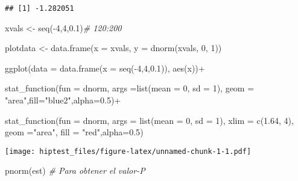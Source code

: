 \documentclass[
]{article}
\newenvironment{Shaded}{}{}
\newcommand{\AttributeTok}[1]{\textcolor[rgb]{0.49,0.56,0.16}{#1}}
\newcommand{\CommentTok}[1]{\textcolor[rgb]{0.38,0.63,0.69}{\textit{#1}}}
\newcommand{\DecValTok}[1]{\textcolor[rgb]{0.25,0.63,0.44}{#1}}
\newcommand{\FloatTok}[1]{\textcolor[rgb]{0.25,0.63,0.44}{#1}}
\newcommand{\FunctionTok}[1]{\textcolor[rgb]{0.02,0.16,0.49}{#1}}
\newcommand{\NormalTok}[1]{#1}
\newcommand{\OtherTok}[1]{\textcolor[rgb]{0.00,0.44,0.13}{#1}}
\newcommand{\SpecialCharTok}[1]{\textcolor[rgb]{0.25,0.44,0.63}{#1}}
\newcommand{\StringTok}[1]{\textcolor[rgb]{0.25,0.44,0.63}{#1}}
\begin{document}
\begin{verbatim}
## [1] -1.282051
\end{verbatim}

\begin{Shaded}
\begin{Highlighting}[]
\NormalTok{xvals }\OtherTok{\textless{}{-}} \FunctionTok{seq}\NormalTok{(}\SpecialCharTok{{-}}\DecValTok{4}\NormalTok{,}\DecValTok{4}\NormalTok{,}\FloatTok{0.1}\NormalTok{)}\CommentTok{\# 120:200}

\NormalTok{plotdata }\OtherTok{\textless{}{-}} \FunctionTok{data.frame}\NormalTok{(}\AttributeTok{x =}\NormalTok{ xvals, }\AttributeTok{y =} \FunctionTok{dnorm}\NormalTok{(xvals, }\DecValTok{0}\NormalTok{, }\DecValTok{1}\NormalTok{))}

\FunctionTok{ggplot}\NormalTok{(}\AttributeTok{data =} \FunctionTok{data.frame}\NormalTok{(}\AttributeTok{x =} \FunctionTok{seq}\NormalTok{(}\SpecialCharTok{{-}}\DecValTok{4}\NormalTok{,}\DecValTok{4}\NormalTok{,}\FloatTok{0.1}\NormalTok{)), }\FunctionTok{aes}\NormalTok{(x))}\SpecialCharTok{+}
 
  \FunctionTok{stat\_function}\NormalTok{(}\AttributeTok{fun =}\NormalTok{ dnorm, }\AttributeTok{args =}\FunctionTok{list}\NormalTok{(}\AttributeTok{mean =} \DecValTok{0}\NormalTok{, }\AttributeTok{sd =} \DecValTok{1}\NormalTok{),}
                \AttributeTok{geom =} \StringTok{"area"}\NormalTok{,}\AttributeTok{fill=}\StringTok{"blue2"}\NormalTok{,}\AttributeTok{alpha=}\FloatTok{0.5}\NormalTok{)}\SpecialCharTok{+}

  \FunctionTok{stat\_function}\NormalTok{(}\AttributeTok{fun =}\NormalTok{ dnorm, }\AttributeTok{args =} \FunctionTok{list}\NormalTok{(}\AttributeTok{mean =} \DecValTok{0}\NormalTok{, }\AttributeTok{sd =} \DecValTok{1}\NormalTok{), }\AttributeTok{xlim =} \FunctionTok{c}\NormalTok{(}\FloatTok{1.64}\NormalTok{, }\DecValTok{4}\NormalTok{),}
                \AttributeTok{geom =}\StringTok{"area"}\NormalTok{, }\AttributeTok{fill =} \StringTok{"red"}\NormalTok{,}\AttributeTok{alpha=}\FloatTok{0.5}\NormalTok{)}
\end{Highlighting}
\end{Shaded}

\texttt{[image: hiptest\_files/figure-latex/unnamed-chunk-1-1.pdf]}

\begin{Shaded}
\begin{Highlighting}[]
\FunctionTok{pnorm}\NormalTok{(est)  }\CommentTok{\# Para obtener el valor{-}P}
\end{Highlighting}
\end{Shaded}
\end{document}
